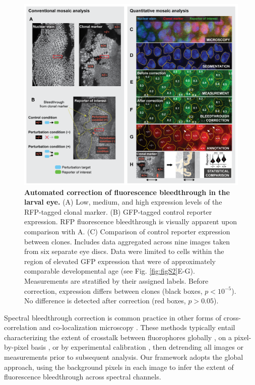 \begin{figure}[t]
\centering
\includegraphics[scale=1.0]{./figure_2}
\caption[Automated correction of fluorescence bleedthrough in the larval eye.]{\textbf{Automated correction of fluorescence bleedthrough in the larval eye.} (A) Low, medium, and high expression levels of the RFP-tagged clonal marker. (B) GFP-tagged control reporter expression. RFP fluorescence bleedthrough is visually apparent upon comparison with A. (C) Comparison of control reporter expression between clones. Includes data aggregated across nine images taken from six separate eye discs. Data were limited to cells within the region of elevated GFP expression that were of approximately comparable developmental age (see Fig. \ref{fig:figS2}E-G). Measurements are stratified by their assigned labels. Before correction, expression differs between clones (black boxes, $p<10^{-5}$). No difference is detected after correction (red boxes, $p>0.05$).}
\label{fig:fig2}
\end{figure}

Spectral bleedthrough correction is common practice in other forms of cross-correlation and co-localization microscopy \cite{Bacia2012,Zinchuk2007}. These methods typically entail characterizing the extent of crosstalk between fluorophores globally \cite{Arsenovic2017,Kim2013}, on a pixel-by-pixel basis \cite{Elangovan2003}, or by experimental calibration \cite{Bacia2012}, then detrending all images or measurements prior to subsequent analysis. Our framework adopts the global approach, using the background pixels in each image to infer the extent of fluorescence bleedthrough across spectral channels.

